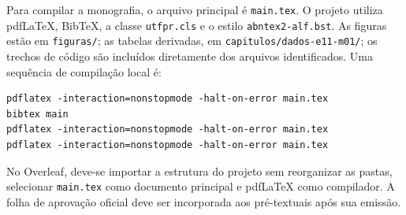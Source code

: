 Para compilar a monografia, o arquivo principal é \texttt{main.tex}. O projeto utiliza pdfLaTeX, BibTeX, a classe \texttt{utfpr.cls} e o estilo \texttt{abntex2-alf.bst}. As figuras estão em \texttt{figuras/}; as tabelas derivadas, em \texttt{capitulos/dados-e11-m01/}; os trechos de código são incluídos diretamente dos arquivos identificados. Uma sequência de compilação local é:

\begin{lstlisting}[style=tcccode,xleftmargin=3.4em,xrightmargin=0.4em,framexleftmargin=0pt,framexrightmargin=0pt,framesep=3pt,numbersep=9pt]
pdflatex -interaction=nonstopmode -halt-on-error main.tex
bibtex main
pdflatex -interaction=nonstopmode -halt-on-error main.tex
pdflatex -interaction=nonstopmode -halt-on-error main.tex
\end{lstlisting}

No Overleaf, deve-se importar a estrutura do projeto sem reorganizar as pastas, selecionar \texttt{main.tex} como documento principal e pdfLaTeX como compilador. A folha de aprovação oficial deve ser incorporada aos pré-textuais após sua emissão.
